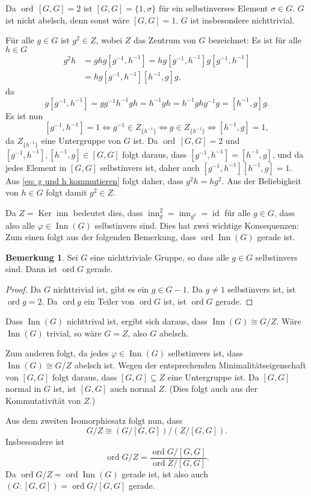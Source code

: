 \documentclass[a4paper,10pt]{article}
\theoremstyle{definition}
\newtheorem{bem}[beh]{Bemerkung}
\newcommand{\id}{\operatorname{id}}
\newcommand{\ord}{\operatorname{ord}}
\newcommand{\inn}{\operatorname{inn}}
\newcommand{\Ker}{\operatorname{Ker}}
\newcommand{\Inn}{\operatorname{Inn}}
\begin{document}
\section{}
Da $\ord\,[G,G] = 2$ ist $[G,G] = \{1, \sigma\}$ für ein selbstinverses Element $\sigma \in G$. $G$ ist nicht abelsch, denn sonst wäre $[G,G] = 1$. $G$ ist insbesondere nichttrivial.

Für alle $g \in G$ ist $g^2 \in Z$, wobei $Z$ das Zentrum von $G$ bezeichnet: Es ist für alle $h \in G$
\begin{equation}\label{eq: g und h kommutieren}
 \begin{aligned}
  g^2 h
  &= g h g \left[g^{-1},h^{-1}\right]
  = h g \left[g^{-1},h^{-1}\right] g \left[g^{-1},h^{-1}\right] \\
  &= h g \left[g^{-1},h^{-1}\right] \left[h^{-1},g\right] g,
 \end{aligned}
\end{equation}
da
\[
 g \left[g^{-1},h^{-1}\right]
 = g g^{-1} h^{-1} g h = h^{-1} g h = h^{-1} g h g^{-1} g = \left[h^{-1},g\right] g.
\]
Es ist nun
\[
 \left[g^{-1},h^{-1}\right] = 1
 \Leftrightarrow g^{-1}  \in Z_{\{h^{-1}\}}
 \Leftrightarrow g \in Z_{\{h^{-1}\}}
 \Leftrightarrow \left[h^{-1},g\right] = 1,
\]
da $Z_{\{h^{-1}\}}$ eine Untergruppe von $G$ ist. Da $\ord\,[G,G] = 2$ und $\left[g^{-1},h^{-1}\right], \left[h^{-1},g\right] \in [G,G]$ folgt daraus, dass $\left[g^{-1},h^{-1}\right] = \left[h^{-1},g\right]$, und da jedes Element in $[G,G]$ selbstinvers ist, daher auch $\left[g^{-1},h^{-1}\right] \left[h^{-1},g\right] = 1$. Aus \eqref{eq: g und h kommutieren} folgt daher, dass $g^2h = hg^2$. Aus der Beliebigkeit von $h \in G$ folgt damit $g^2 \in Z$.

Da $Z = \Ker \inn$ bedeutet dies, dass $\inn_g^2 = \inn_{g^2} = \id$ für alle $g \in G$, dass also alle $\varphi \in \Inn(G)$ selbstinvers sind. Dies hat zwei wichtige Konsequenzen: Zum einen folgt aus der folgenden Bemerkung, dass $\ord \Inn(G)$ gerade ist.

\begin{bem}
 Sei $G$ eine nichttriviale Gruppe, so dass alle $g \in G$ selbstinvers sind. Dann ist $\ord G$ gerade.
\end{bem}
\begin{proof}
 Da $G$ nichttrivial ist, gibt es ein $g \in G-1$. Da $g \neq 1$ selbstinvers ist, ist $\ord g = 2$. Da $\ord g$ ein Teiler von $\ord G$ ist, ist $\ord G$ gerade.
\end{proof}

Dass $\Inn(G)$ nichttrival ist, ergibt sich daraus, dass $\Inn(G) \cong G/Z$. Wäre $\Inn(G)$ trivial, so wäre $G = Z$, also $G$ abelsch.

Zum anderen folgt, da jedes $\varphi \in \Inn(G)$ selbstinvers ist, dass $\Inn(G) \cong G/Z$ abelsch ist. Wegen der entsprechenden Minimalitätseigenschaft von $[G,G]$ folgt daraus, dass $[G,G] \subseteq Z$ eine Untergruppe ist. Da $[G,G]$ normal in $G$ ist, ist $[G,G]$ auch normal $Z$. (Dies folgt auch aus der Kommutativität von $Z$.)

Aus dem zweiten Isomorphiesatz folgt nun, dass
\[
 G/Z \cong (G/[G,G])/(Z/[G,G]).
\]
Insbesondere ist
\[
 \ord G/Z = \frac{\ord G/[G,G]}{\ord Z/[G,G]}.
\]
Da $\ord G/Z = \ord \Inn(G)$ gerade ist, ist also auch $(G : [G,G]) = \ord G/[G,G]$ gerade.
\end{document}
